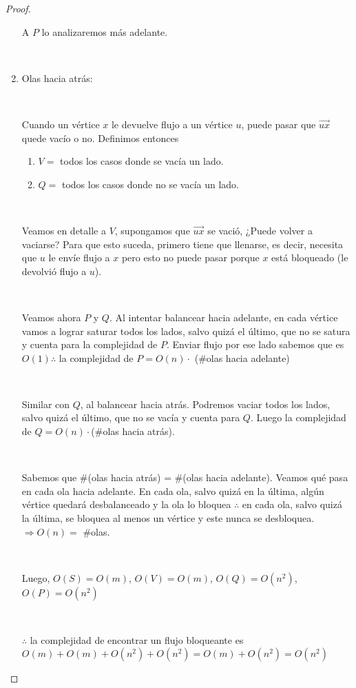 \documentclass[11pt]{article}
\begin{document}
\begin{proof}
\begin{enumerate}
A $P$ lo analizaremos más adelante.\par
\

\item Olas hacia atrás:\par
\

Cuando un vértice $x$ le devuelve flujo a un vértice $u$, puede pasar que $\overrightarrow{ux}$ quede vacío o no. Definimos entonces \par
\begin{enumerate}
	\item $V = $ todos los casos donde se vacía un lado.\par
	\item $Q = $ todos los casos donde no se vacía un lado.\par
\end{enumerate}
\

Veamos en detalle a $V$, supongamos que  $\overrightarrow{ux}$ se vació, ¿Puede volver a vaciarse? Para que esto suceda, primero tiene que llenarse, es decir, necesita que $u$ le envíe flujo a $x$ pero esto no puede pasar porque $x$ está bloqueado (le devolvió flujo a $u$).\par
\

Veamos ahora $P$ y $Q$. Al intentar balancear hacia adelante, en cada vértice vamos a lograr saturar todos los lados, salvo quizá el último, que no se satura y cuenta para la complejidad de $P$. Enviar flujo por ese lado sabemos que es $O(1) \therefore$ la complejidad de $P = O(n) \cdot$ (\#olas hacia adelante) \par
\

Similar con $Q$, al balancear hacia atrás. Podremos vaciar todos los lados, salvo quizá el último, que no se vacía y cuenta para $Q$. Luego la complejidad de $Q = O(n) \cdot $(\#olas hacia atrás). \par
\

Sabemos que \#(olas hacia atrás) = \#(olas hacia adelante). Veamos qué pasa en cada ola hacia adelante. En cada ola, salvo quizá en la última, algún vértice quedará desbalanceado y la ola lo bloquea $\therefore$ en cada ola, salvo quizá la última, se bloquea al menos un vértice y este nunca se desbloquea. $\Rightarrow O(n) = $ \#olas.\par
\

Luego, $O(S) = O(m)$,  $O(V) = O(m)$, $O(Q) = O(n^{2})$, $O(P) = O(n^{2})$ \par
\

$\therefore$ la complejidad de encontrar un flujo bloqueante es $O(m) + O(m) + O(n^{2}) + O(n^{2}) = O(m) + O(n^{2}) = O(n^{2})$


\end{enumerate}

\end{proof}
\end{document}
